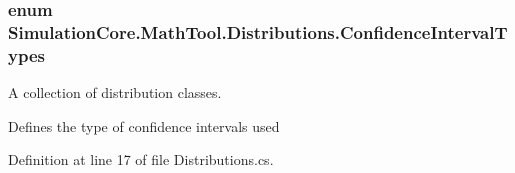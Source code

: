 \subsubsection[{\texorpdfstring{Confidence\+Interval\+Types}{ConfidenceIntervalTypes}}]{\setlength{\rightskip}{0pt plus 5cm}enum {\bf Simulation\+Core.\+Math\+Tool.\+Distributions.\+Confidence\+Interval\+Types}\hspace{0.3cm}{\ttfamily [strong]}}\hypertarget{namespace_simulation_core_1_1_math_tool_1_1_distributions_a4c9ae1b703094a62fce6e2b2415e1122}{}\label{namespace_simulation_core_1_1_math_tool_1_1_distributions_a4c9ae1b703094a62fce6e2b2415e1122}


A collection of distribution classes. 

Defines the type of confidence intervals used 

Definition at line 17 of file Distributions.\+cs.

